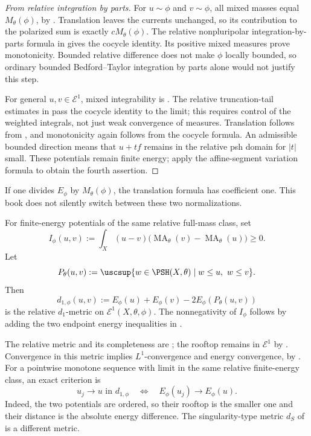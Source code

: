 \begin{proof}[From relative integration by parts]
For \(u\sim\phi\) and \(v\sim\phi\), all mixed masses equal
\(M_\theta(\phi)\), by \cite[Propositions~3.1.3 and 3.1.14]{XiaBook}.
Translation leaves the currents unchanged, so its contribution to the
polarized sum is exactly \(cM_\theta(\phi)\).  The relative
nonpluripolar integration-by-parts formula in
\cite[Lemma~3.1.3, equation~(3.32)]{XiaBook} gives the cocycle identity.
Its positive mixed measures prove monotonicity.  Bounded relative
difference does not make \(\phi\) locally bounded, so ordinary bounded
Bedford--Taylor integration by parts alone would not justify this step.

For general \(u,v\in\mathcal E^1\), mixed integrability is
\cite[Corollary~3.1.6]{XiaBook}.  The relative truncation-tail estimates
in \cite[Proposition~3.1.18, equations~(3.40)--(3.43)]{XiaBook} pass the
cocycle identity to the limit; this requires control of the weighted
integrals, not just weak convergence of measures.  Translation follows
from \cite[equation~(3.31)]{XiaBook}, and monotonicity again follows
from the cocycle formula.  An admissible bounded direction means that
\(u+tf\) remains in the relative psh domain for \(|t|\) small.  These
potentials remain finite energy; apply the affine-segment variation
formula \cite[Lemma~3.1.11]{XiaBook} to obtain the fourth assertion.
\end{proof}

If one divides \(E_\phi\) by \(M_\theta(\phi)\), the translation formula
has coefficient one. This book does not silently switch between these two
normalizations.

\begin{definition}
\label{def:appH-i-d1}
For finite-energy potentials of the same relative full-mass class, set
\[
 I_\phi(u,v)
 :=\int_X(u-v)
     \bigl(\operatorname{MA}_\theta(v)
           -\operatorname{MA}_\theta(u)\bigr)\geq0.
\]
Let
\[
 P_\theta(u,v)
 :=\uscsup\{w\in\PSH(X,\theta)\mid w\leq u,\ w\leq v\}.
\]
Then
\[
 d_{1,\phi}(u,v)
 :=E_\phi(u)+E_\phi(v)-2E_\phi(P_\theta(u,v))
\]
is the relative \(d_1\)-metric on \(\mathcal E^1(X,\theta,\phi)\).
The nonnegativity of \(I_\phi\) follows by adding the two endpoint energy
inequalities in \cite[Proposition~3.1.19]{XiaBook}.
\end{definition}

The relative metric and its completeness are
\cite[Lemma~4.3.1 and Theorem~4.3.2]{XiaBook}; the rooftop remains in
\(\mathcal E^1\) by \cite[Proposition~3.1.21]{XiaBook}.
Convergence in this metric implies \(L^1\)-convergence and energy
convergence, by \cite[Lemma~4.3.5 and Theorem~4.3.3]{XiaBook}.
For a pointwise monotone sequence with limit in the same relative
finite-energy class, an exact criterion is
\[
 u_j\longrightarrow u\text{ in }d_{1,\phi}
 \quad\Longleftrightarrow\quad
 E_\phi(u_j)\longrightarrow E_\phi(u).
\]
Indeed, the two potentials are ordered, so their rooftop is the smaller
one and their distance is the absolute energy difference.  The
singularity-type metric \(d_S\) of \cite{DDNLmetric} is a different metric.

